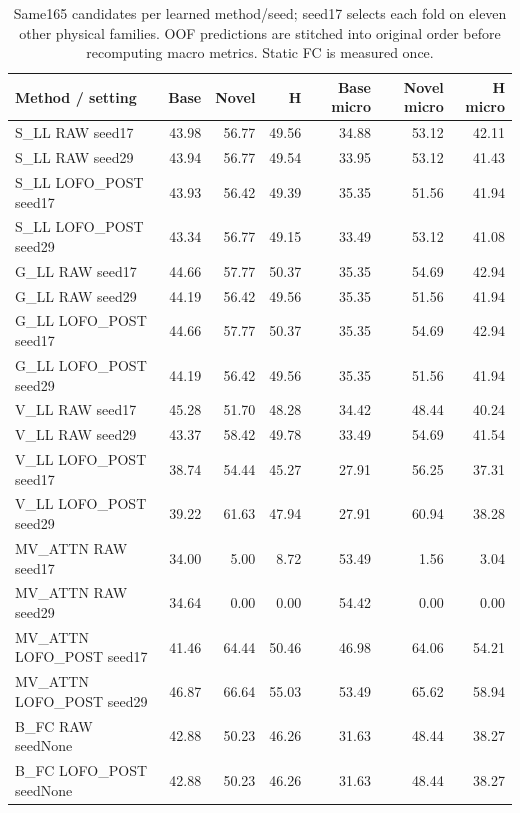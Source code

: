 \begin{table}[t]
\centering
\small
\caption{Same165 candidates per learned method/seed; seed17 selects each fold on eleven other physical families. OOF predictions are stitched into original order before recomputing macro metrics. Static FC is measured once.}
\label{tab:benchmark-s5}
\begin{tabular}{lrrrrrr}
\toprule
Method / setting & Base & Novel & H & Base micro & Novel micro & H micro \\
\midrule
S\_LL RAW seed17 & 43.98 & 56.77 & 49.56 & 34.88 & 53.12 & 42.11 \\
S\_LL RAW seed29 & 43.94 & 56.77 & 49.54 & 33.95 & 53.12 & 41.43 \\
S\_LL LOFO\_POST seed17 & 43.93 & 56.42 & 49.39 & 35.35 & 51.56 & 41.94 \\
S\_LL LOFO\_POST seed29 & 43.34 & 56.77 & 49.15 & 33.49 & 53.12 & 41.08 \\
G\_LL RAW seed17 & 44.66 & 57.77 & 50.37 & 35.35 & 54.69 & 42.94 \\
G\_LL RAW seed29 & 44.19 & 56.42 & 49.56 & 35.35 & 51.56 & 41.94 \\
G\_LL LOFO\_POST seed17 & 44.66 & 57.77 & 50.37 & 35.35 & 54.69 & 42.94 \\
G\_LL LOFO\_POST seed29 & 44.19 & 56.42 & 49.56 & 35.35 & 51.56 & 41.94 \\
V\_LL RAW seed17 & 45.28 & 51.70 & 48.28 & 34.42 & 48.44 & 40.24 \\
V\_LL RAW seed29 & 43.37 & 58.42 & 49.78 & 33.49 & 54.69 & 41.54 \\
V\_LL LOFO\_POST seed17 & 38.74 & 54.44 & 45.27 & 27.91 & 56.25 & 37.31 \\
V\_LL LOFO\_POST seed29 & 39.22 & 61.63 & 47.94 & 27.91 & 60.94 & 38.28 \\
MV\_ATTN RAW seed17 & 34.00 & 5.00 & 8.72 & 53.49 & 1.56 & 3.04 \\
MV\_ATTN RAW seed29 & 34.64 & 0.00 & 0.00 & 54.42 & 0.00 & 0.00 \\
MV\_ATTN LOFO\_POST seed17 & 41.46 & 64.44 & 50.46 & 46.98 & 64.06 & 54.21 \\
MV\_ATTN LOFO\_POST seed29 & 46.87 & 66.64 & 55.03 & 53.49 & 65.62 & 58.94 \\
B\_FC RAW seedNone & 42.88 & 50.23 & 46.26 & 31.63 & 48.44 & 38.27 \\
B\_FC LOFO\_POST seedNone & 42.88 & 50.23 & 46.26 & 31.63 & 48.44 & 38.27 \\
\bottomrule
\end{tabular}
\end{table}
